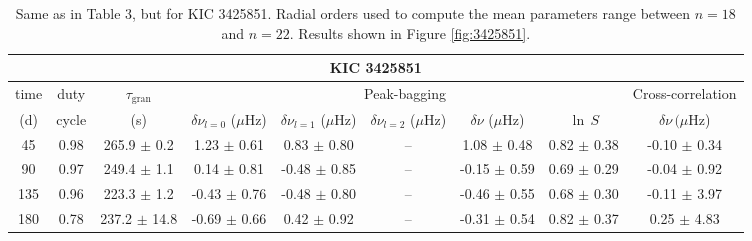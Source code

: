 \documentclass[twocolumn]{aastex61}%
\begin{document}
\begin{table*}[ht]\centering\fontsize{9.}{7.}\selectfont
\begin{tabular}{ccc|ccccc|c}
\multicolumn{9}{c}{KIC 3425851}\\ \hline\hline
time & duty & $\tau_\text{gran}$ &\multicolumn{5}{c|}{Peak-bagging}&Cross-correlation\\
(d)& cycle & (s)&$\delta\nu_{l=0}$ ($\mu$Hz) & $\delta\nu_{l=1}$ ($\mu$Hz) & $\delta\nu_{l=2}$ ($\mu$Hz) & $\delta\nu$ ($\mu$Hz)& $\ln\,S$ & $\delta\nu\,(\mu$Hz)\\\hline
45 & 0.98 & 265.9 $\pm$ 0.2 & 1.23 $\pm$ 0.61 & 0.83 $\pm$ 0.80 & -- & 1.08 $\pm$ 0.48 & 0.82 $\pm$ 0.38 & -0.10 $\pm$ 0.34\\
90 & 0.97 & 249.4 $\pm$ 1.1 & 0.14 $\pm$ 0.81 & -0.48 $\pm$ 0.85 & -- & -0.15 $\pm$ 0.59 & 0.69 $\pm$ 0.29 & -0.04 $\pm$ 0.92\\
135 & 0.96 & 223.3 $\pm$ 1.2 & -0.43 $\pm$ 0.76 & -0.48 $\pm$ 0.80 & -- & -0.46 $\pm$ 0.55 & 0.68 $\pm$ 0.30 & -0.11 $\pm$ 3.97\\
180 & 0.78 & 237.2 $\pm$ 14.8 & -0.69 $\pm$ 0.66 & 0.42 $\pm$ 0.92 & -- & -0.31 $\pm$ 0.54 & 0.82 $\pm$ 0.37 & 0.25 $\pm$ 4.83\\
\end{tabular}
\caption{Same as in Table 3, but for KIC 3425851. Radial orders used to compute the mean parameters range between $n=18$ and $n=22$. Results shown in Figure \ref{fig:3425851}.}\label{tab:3425851}
\end{table*}
\end{document}
